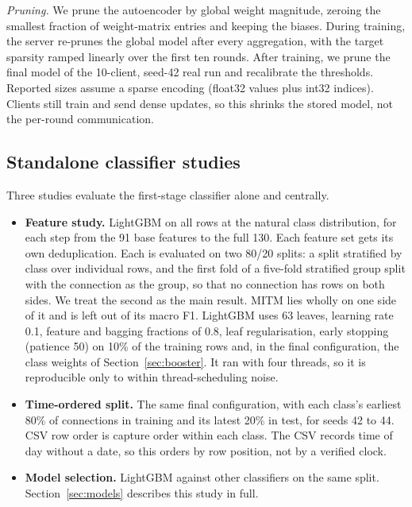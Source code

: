 \textit{Pruning.} We prune the autoencoder by global weight magnitude, zeroing the smallest fraction of weight-matrix entries and keeping the biases. During training, the server re-prunes the global model after every aggregation, with the target sparsity ramped linearly over the first ten rounds. After training, we prune the final model of the 10-client, seed-42 real run and recalibrate the thresholds. Reported sizes assume a sparse encoding (float32 values plus int32 indices). Clients still train and send dense updates, so this shrinks the stored model, not the per-round communication.

\subsection{Standalone classifier studies}
Three studies evaluate the first-stage classifier alone and centrally.
\begin{itemize}
  \item \textbf{Feature study.} LightGBM on all rows at the natural class distribution, for each step from the 91 base features to the full 130. Each feature set gets its own deduplication. Each is evaluated on two 80/20 splits: a split stratified by class over individual rows, and the first fold of a five-fold stratified group split with the connection as the group, so that no connection has rows on both sides. We treat the second as the main result. MITM lies wholly on one side of it and is left out of its macro F1. LightGBM uses 63 leaves, learning rate 0.1, feature and bagging fractions of 0.8, leaf regularisation, early stopping (patience 50) on 10\% of the training rows and, in the final configuration, the class weights of Section~\ref{sec:booster}. It ran with four threads, so it is reproducible only to within thread-scheduling noise.
  \item \textbf{Time-ordered split.} The same final configuration, with each class's earliest 80\% of connections in training and its latest 20\% in test, for seeds 42 to 44. CSV row order is capture order within each class. The CSV records time of day without a date, so this orders by row position, not by a verified clock.
  \item \textbf{Model selection.} LightGBM against other classifiers on the same split. Section~\ref{sec:models} describes this study in full.
\end{itemize}

